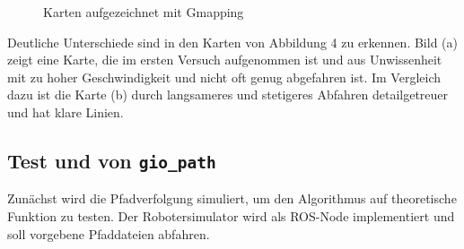 \documentclass[11pt,a4paper]{article}
\begin{document}
{{	\begin{figure}[h]
		\centering
		\caption{Karten aufgezeichnet mit Gmapping}
	\end{figure}
	
	
	Deutliche Unterschiede sind in den Karten von Abbildung 4 zu erkennen. Bild (a) zeigt eine Karte, die im ersten Versuch aufgenommen ist und aus Unwissenheit mit zu hoher Geschwindigkeit und nicht oft genug abgefahren ist. Im Vergleich dazu ist die Karte (b) durch langsameres und stetigeres Abfahren detailgetreuer und hat klare Linien.
	
		
}




\subsection{Test und von \texttt{gio\_path}}


Zun\"achst wird die Pfadverfolgung simuliert, um den Algorithmus auf theoretische Funktion zu testen. Der Robotersimulator wird als ROS-Node implementiert und soll vorgebene Pfaddateien abfahren.


\begin{figure}[h]
\end{figure}}
\end{document}
